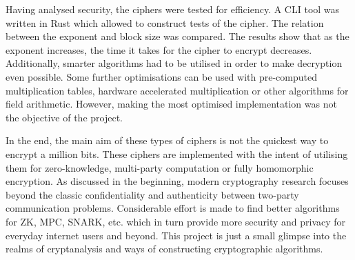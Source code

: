 \documentclass{Resources/UoBLab1}
\theoremstyle{definition}
\begin{document}
Having analysed security, the ciphers were tested for efficiency. A CLI tool was written in Rust which allowed to construct tests of the cipher. The relation between the exponent and block size was compared. The results show that as the exponent increases, the time it takes for the cipher to encrypt decreases. Additionally, smarter algorithms had to be utilised in order to make decryption even possible. Some further optimisations can be used with pre-computed multiplication tables, hardware accelerated multiplication or other algorithms for field arithmetic. However, making the most optimised implementation was not the objective of the project.

In the end, the main aim of these types of ciphers is not the quickest way to encrypt a million bits. These ciphers are implemented with the intent of utilising them for zero-knowledge, multi-party computation or fully homomorphic encryption. As discussed in the beginning, modern cryptography research focuses beyond the classic confidentiality and authenticity between two-party communication problems. Considerable effort is made to find better algorithms for ZK, MPC, SNARK, etc. which in turn provide more security and privacy for everyday internet users and beyond. This project is just a small glimpse into the realms of cryptanalysis and ways of constructing cryptographic algorithms.
\end{document}
